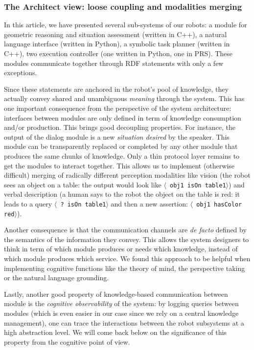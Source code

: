 \documentclass[letterpaper, 10 pt, conference]{ieeeconf}  %
\newcommand{\stmt}[1]{{\footnotesize \tt $\langle$ #1\relax$\rangle$}}
\begin{document}
\subsubsection{The Architect view: loose coupling and modalities merging}

In this article, we have presented several sub-systems of our robots: a module for geometric
reasoning and situation assessment (written in C++), a natural
language interface (written in Python), a symbolic task planner (written in
C++), two execution controller (one written in Python, one in PRS). These
modules communicate together through RDF statements with only a few exceptions.

Since these statements are anchored in the robot's pool of knowledge, they
actually convey shared and unambiguous \emph{meaning} through the system. This
has one important consequence from the perspective of the system architecture:
interfaces between modules are only defined in term of knowledge consumption and/or
production. This brings good decoupling properties. For instance, the output of
the dialog module is a new \emph{situation desired} by the speaker. This module
can be transparently replaced or completed by any other module that produces
the same chunks of knowledge. Only a thin protocol layer remains to get the
modules to interact together. This allows us to implement (otherwise difficult)
merging of radically different perception modalities like vision (the robot
sees an object on a table: the output would look like \stmt{obj1 isOn table1})
and verbal description (a human says to the robot the object on the table
is red: it leads to a query \stmt{? isOn table1} and then a new assertion:
\stmt{obj1 hasColor red}).

Another consequence is that the communication channels are {\it
de facto} defined by the semantics of the information they
convey. This allows the system designers to think in term of which module
produces or needs which knowledge, instead of which module produces which
service. We found this approach to be helpful when implementing cognitive
functions like the theory of mind, the perspective taking or the natural
language grounding.

Lastly, another good property of knowledge-based communication between module
is the \emph{cognitive observability} of the system: by logging queries between
modules (which is even easier in our case since we rely on a central knowledge
management), one can trace the interactions between the robot subsystems at a high
abstraction level. We will come back below on the significance of this property
from the cognitive point of view.
\end{document}
